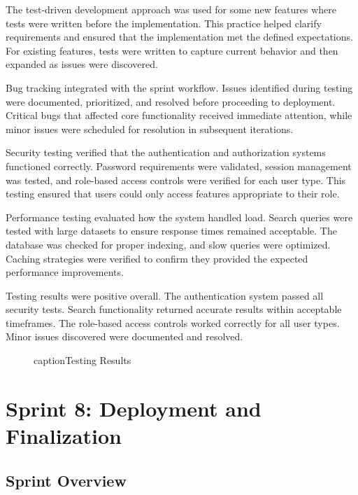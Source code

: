 The test-driven development approach was used for some new
features where tests were written before the implementation.
This practice helped clarify requirements and ensured that
the implementation met the defined expectations. For existing
features, tests were written to capture current behavior and
then expanded as issues were discovered.

Bug tracking integrated with the sprint workflow. Issues
identified during testing were documented, prioritized, and
resolved before proceeding to deployment. Critical bugs that
affected core functionality received immediate attention,
while minor issues were scheduled for resolution in subsequent
iterations.

Security testing verified that the authentication and authorization
systems functioned correctly. Password requirements were validated,
session management was tested, and role-based access controls
were verified for each user type. This testing ensured that
users could only access features appropriate to their role.

Performance testing evaluated how the system handled load.
Search queries were tested with large datasets to ensure
response times remained acceptable. The database was checked
for proper indexing, and slow queries were optimized. Caching
strategies were verified to confirm they provided the expected
performance improvements.

Testing results were positive overall. The authentication
system passed all security tests. Search functionality returned
accurate results within acceptable timeframes. The role-based
access controls worked correctly for all user types. Minor
issues discovered were documented and resolved.

\begin{figure}[H]
\begin{center}
\end{center}
caption{Testing Results}
\label{fig:testing_results}
\end{figure}

\section*{Sprint 8: Deployment and Finalization}

\subsection*{Sprint Overview}

